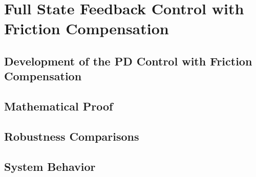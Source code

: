 \section{Full State Feedback Control with Friction Compensation}

\subsection{Development of the PD Control with Friction Compensation}
\subsection{Mathematical Proof}
\subsection{Robustness Comparisons}
\subsection{System Behavior}
